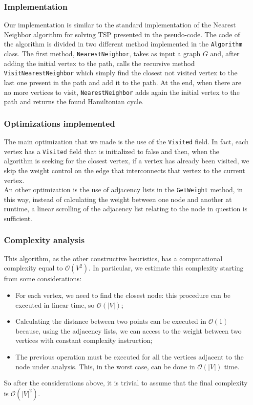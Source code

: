 \subsubsection{Implementation}
Our implementation is similar to the standard implementation of the Nearest Neighbor algorithm for solving TSP presented in the pseudo-code. The code of the algorithm is divided in two different method implemented in the \verb|Algorithm| class.
The first method, \verb|NearestNeighbor|, takes as input a graph $G$ and, after adding the initial vertex to the path, calls the recursive method \verb|VisitNearestNeighbor| which simply find the closest not visited vertex to the last one present in the path and add it to the path. At the end, when there are no more vertices to visit, \verb|NearestNeighbor| adds again the initial vertex to the path and returns the found Hamiltonian cycle.

\subsubsection{Optimizations implemented}
The main optimization that we made is the use of the \verb|Visited| field. In fact, each vertex has a \verb|Visited| field that is initialized to false and then, when the algorithm is seeking for the closest vertex, if a vertex has already been visited, we skip the weight control on the edge that interconnects that vertex to the current vertex. \\
An other optimization is the use of adjacency lists in the \verb|GetWeight| method, in this way, instead of calculating the weight between one node and another at runtime, a linear scrolling of the adjacency list relating to the node in question is sufficient.

\subsubsection{Complexity analysis}
This algorithm, as the other constructive heuristics, has a computational complexity equal to $\mathcal{O}(V^2)$. In particular, we estimate this complexity starting from some considerations:
\begin{itemize}
    \item For each vertex, we need to find the closest node: this procedure can be executed in linear time, so $\mathcal{O}(|V|)$;
    \item Calculating the distance between two points can be executed in $\mathcal{O}(1)$ because, using the adjacency lists, we can access to the weight between two vertices with constant complexity instruction;
    \item The previous operation must be executed for all the vertices adjacent to the node under analysis. This, in the worst case, can be done in $\mathcal{O}(|V|)$ time.
\end{itemize}
\noindent
So after the considerations above, it is trivial to assume that the final complexity is $\mathcal{O}(|V|^2)$.

